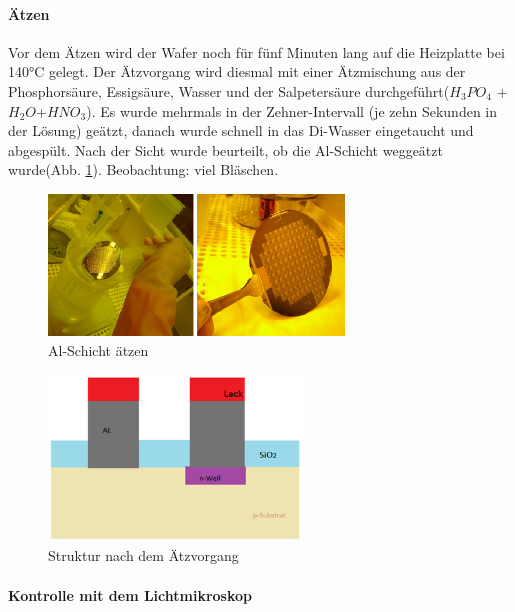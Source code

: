 \paragraph[Ätzen]{Ätzen}

\vspace{10mm}
Vor dem Ätzen wird der Wafer noch für fünf Minuten lang auf die Heizplatte bei 140°C gelegt.
Der Ätzvorgang wird diesmal mit einer Ätzmischung aus der Phosphorsäure, Essigsäure, Wasser und der Salpetersäure durchgeführt($H_{3}PO_{4}$ +$H_{2}O$+$HNO_{3}$). Es wurde mehrmals in der Zehner-Intervall (je zehn Sekunden in der Lösung) geätzt, danach wurde schnell in das Di-Wasser eingetaucht und abgespült.  Nach der Sicht wurde beurteilt, ob die Al-Schicht weggeätzt wurde(Abb. \ref{fig:AlSchichtaetzen}). Beobachtung: viel Bläschen.

\begin{figure}[H]
    \centering
        \includegraphics[width=0.7\textwidth]{bilder/AlSchichtaetzen.png}
    \caption{Al-Schicht ätzen}
    \label{fig:AlSchichtaetzen}
\end{figure}


\begin{figure}[H]
    \centering
        \includegraphics[width=0.6\textwidth]{bilder/StrukturnachdemAetzvorgang.png}
    \caption{Struktur nach dem Ätzvorgang}
    \label{fig:StrukturnachdemAetzvorgang}
\end{figure}


\paragraph[Kontrolle mit dem Lichtmikroskop]{Kontrolle mit dem Lichtmikroskop }


